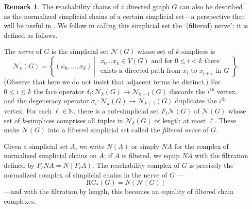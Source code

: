 \documentclass[a4paper, 11 pt, oneside, reqno]{amsart}
\numberwithin{lemma}{section}
\theoremstyle{definition}
\newtheorem{remark}[lemma]{Remark}
\newcommand{\demph}[1]{\emph{#1}}
\newcommand{\Nv}{\mathcal{N}}
\newcommand{\RC}{\mathrm{RC}}
\begin{document}
\begin{remark}\label{rmk:nerve}
    The reachability chains of a directed graph $G$ can also be described as the normalized simplicial chains of a certain simplicial set---a perspective that will be useful in . We follow \cite[Section 1.2]{DIMZ} in calling this simplicial set the `(filtered) nerve'; it is defined as follows.

    The \demph{nerve} of \(G\) is the simplicial set \(\Nv(G)\) whose set of \(k\)-simplices is
    \[\Nv_k(G) = \left\{(x_0, \ldots, x_k) \middle\vert 
    \begin{array}{l}
    x_0 \ldots x_k \in V(G) \text{ and for } 0 \leq i < k \text{ there} \\
    \text{exists a directed path from } x_i \text{ to } x_{i+1} \text{ in } G
    \end{array}
    \right\}.\]
    (Observe that here we do not insist that adjacent terms be distinct.) For \(0 \leq i \leq k\) the face operator \(\delta_i\colon \Nv_k(G) \to \Nv_{k-1}(G)\) discards the \(i^\mathrm{th}\) vertex, and the degeneracy operator \(\sigma_i\colon \Nv_k(G) \to \Nv_{k+1}(G)\) duplicates the \(i^\mathrm{th}\) vertex. For each \(\ell \in \mathbb{N}\), there is a sub-simplicial set $F_\ell\Nv(G)$ of \(\Nv(G)\) whose set of \(k\)-simplices comprises all tuples in \(\Nv_k(G)\) of length at most $\ell$. 
    These make \(\Nv(G)\) into a filtered simplicial set called the \demph{filtered nerve} of \(G\). 
    
    Given a simplicial set $A$, we write $N(A)$ or simply $NA$ for the complex of normalized simplicial chains on $A$; if $A$ is filtered, we equip $NA$ with the filtration defined by $F_\ell NA = N(F_\ell A)$. The reachability complex of \(G\) is precisely the normalized complex of simplicial chains in the nerve of \(G\) \cite[Section 4]{HepworthRoff2023}---
    \[
    \RC_\ast(G) = N(\Nv(G))
    \]
    ---and with the filtration by length, this becomes an equality of filtered chain complexes.
\end{remark} 
\end{document}
